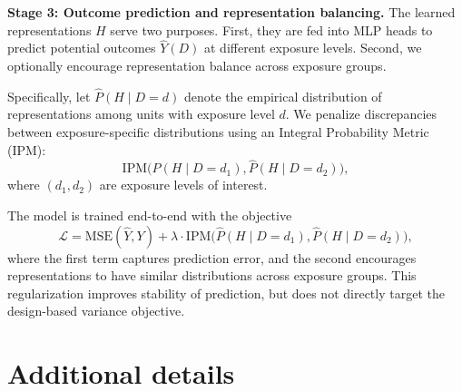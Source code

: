 \documentclass{article}
\theoremstyle{plain}
\theoremstyle{definition}
\theoremstyle{remark}
\begin{document}
\textbf{Stage 3: Outcome prediction and representation balancing.}
The learned representations $H$ serve two purposes. First, they are fed into MLP heads to predict potential outcomes $\hat{Y}(D)$ at different exposure levels. Second, we optionally encourage representation balance across exposure groups.

Specifically, let $\widehat{P}(H \mid D=d)$ denote the empirical distribution of representations among units with exposure level $d$. We penalize discrepancies between exposure-specific distributions using an Integral Probability Metric (IPM):
\[
\mathrm{IPM}\bigl(\widehat{P}(H \mid D=d_1), \widehat{P}(H \mid D=d_2)\bigr),
\]
where $(d_1,d_2)$ are exposure levels of interest.

The model is trained end-to-end with the objective
\[
\mathcal{L} = \mathrm{MSE}(\hat{Y}, Y) 
+ \lambda \cdot 
\mathrm{IPM}\bigl(\widehat{P}(H \mid D=d_1), \widehat{P}(H \mid D=d_2)\bigr),
\]
where the first term captures prediction error, and the second encourages representations to have similar distributions across exposure groups. This regularization improves stability of prediction, but does not directly target the design-based variance objective.



\section{Additional details}
\end{document}
